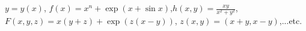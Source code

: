 \documentclass[11 pt]{article}
\begin{document}
%
%


%





\newpage
$y=y(x)$, $f(x)=x^{n}+\exp(x+\sin x)$,$h(x,y)=\frac{xy}{x^{2}+y^{2}}$, $F(x,y,z)=x(y+z)+\exp(z(x-y))$, $z(x,y)=(x+y,x-y)$,...etc.\\
\end{document}
